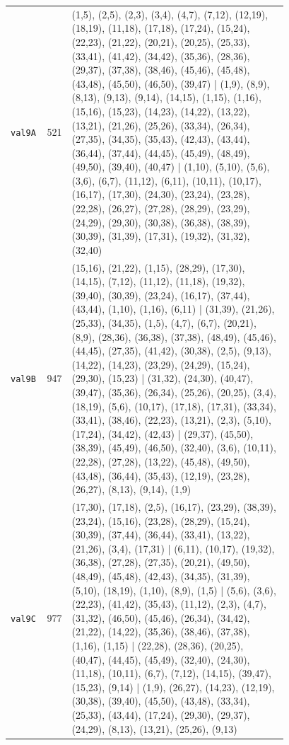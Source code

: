 \begin{landscape}
\begin{longtable}{lr>{\tiny\raggedright\arraybackslash}p{0.78\linewidth}}
\texttt{val9A} & 521 & (1,5), (2,5), (2,3), (3,4), (4,7), (7,12), (12,19), (18,19), (11,18), (17,18), (17,24), (15,24), (22,23), (21,22), (20,21), (20,25), (25,33), (33,41), (41,42), (34,42), (35,36), (28,36), (29,37), (37,38), (38,46), (45,46), (45,48), (43,48), (45,50), (46,50), (39,47) | (1,9), (8,9), (8,13), (9,13), (9,14), (14,15), (1,15), (1,16), (15,16), (15,23), (14,23), (14,22), (13,22), (13,21), (21,26), (25,26), (33,34), (26,34), (27,35), (34,35), (35,43), (42,43), (43,44), (36,44), (37,44), (44,45), (45,49), (48,49), (49,50), (39,40), (40,47) | (1,10), (5,10), (5,6), (3,6), (6,7), (11,12), (6,11), (10,11), (10,17), (16,17), (17,30), (24,30), (23,24), (23,28), (22,28), (26,27), (27,28), (28,29), (23,29), (24,29), (29,30), (30,38), (36,38), (38,39), (30,39), (31,39), (17,31), (19,32), (31,32), (32,40) \\[2pt]
\texttt{val9B} & 947 & (15,16), (21,22), (1,15), (28,29), (17,30), (14,15), (7,12), (11,12), (11,18), (19,32), (39,40), (30,39), (23,24), (16,17), (37,44), (43,44), (1,10), (1,16), (6,11) | (31,39), (21,26), (25,33), (34,35), (1,5), (4,7), (6,7), (20,21), (8,9), (28,36), (36,38), (37,38), (48,49), (45,46), (44,45), (27,35), (41,42), (30,38), (2,5), (9,13), (14,22), (14,23), (23,29), (24,29), (15,24), (29,30), (15,23) | (31,32), (24,30), (40,47), (39,47), (35,36), (26,34), (25,26), (20,25), (3,4), (18,19), (5,6), (10,17), (17,18), (17,31), (33,34), (33,41), (38,46), (22,23), (13,21), (2,3), (5,10), (17,24), (34,42), (42,43) | (29,37), (45,50), (38,39), (45,49), (46,50), (32,40), (3,6), (10,11), (22,28), (27,28), (13,22), (45,48), (49,50), (43,48), (36,44), (35,43), (12,19), (23,28), (26,27), (8,13), (9,14), (1,9) \\[2pt]
\texttt{val9C} & 977 & (17,30), (17,18), (2,5), (16,17), (23,29), (38,39), (23,24), (15,16), (23,28), (28,29), (15,24), (30,39), (37,44), (36,44), (33,41), (13,22), (21,26), (3,4), (17,31) | (6,11), (10,17), (19,32), (36,38), (27,28), (27,35), (20,21), (49,50), (48,49), (45,48), (42,43), (34,35), (31,39), (5,10), (18,19), (1,10), (8,9), (1,5) | (5,6), (3,6), (22,23), (41,42), (35,43), (11,12), (2,3), (4,7), (31,32), (46,50), (45,46), (26,34), (34,42), (21,22), (14,22), (35,36), (38,46), (37,38), (1,16), (1,15) | (22,28), (28,36), (20,25), (40,47), (44,45), (45,49), (32,40), (24,30), (11,18), (10,11), (6,7), (7,12), (14,15), (39,47), (15,23), (9,14) | (1,9), (26,27), (14,23), (12,19), (30,38), (39,40), (45,50), (43,48), (33,34), (25,33), (43,44), (17,24), (29,30), (29,37), (24,29), (8,13), (13,21), (25,26), (9,13) \\[2pt]

\end{longtable}
\end{landscape}
